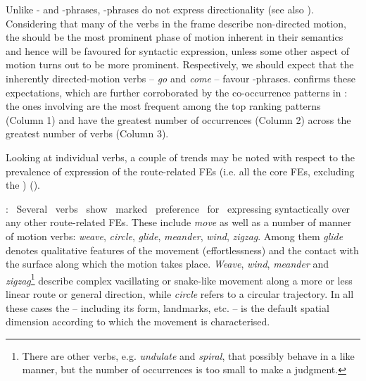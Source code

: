 \documentclass[output=paper,colorlinks,citecolor=brown]{langscibook}
\begin{document}
Unlike - and -phrases, -phrases %
do not express directionality %
(see also \cite[31]{Pantcheva2011}). Considering that many of the verbs in the  frame describe non-directed motion, the  should be the most prominent phase of motion inherent in their semantics and hence will be favoured for syntactic expression, unless some other aspect of motion turns out to be more prominent. Respectively, we should expect that the inherently directed-motion verbs -- \textit{go} and \textit{come} -- favour -phrases.  confirms these expectations, which are further corroborated by the co-occurrence patterns in : the ones involving  are the most frequent among the top ranking patterns (Column 1) and have the greatest number of occurrences (Column 2) across the greatest number of verbs (Column 3).

Looking at individual verbs, a couple of trends may be noted with respect to the prevalence of expression of the route-related FEs (i.e. all the core FEs, excluding the ) ().

:~ Several~ verbs~ show~ marked~ preference~ for~ expressing syntactically  over any other route-related FEs. These include \textit{move} as well as a number of manner of motion verbs: \textit{weave}, %
\textit{circle}, \textit{glide}, \textit{meander}, \textit{wind}, \textit{zigzag}. %
Among them \textit{glide} denotes qualitative features of the movement (effortlessness) and the contact with the surface along which the motion takes place. \textit{Weave}, \textit{wind}, \textit{meander} and \textit{zigzag}\footnote{There are other verbs, e.g. \textit{undulate} and \textit{spiral}, that possibly behave in a like manner, but the number of occurrences is too small to make a judgment.} describe complex vacillating or snake-like movement along a more or less linear route or general direction, while \textit{circle} refers to a circular trajectory. In all these cases the  -- including its form, landmarks, etc. --  is the default spatial dimension according to which the movement is characterised.
\end{document}
